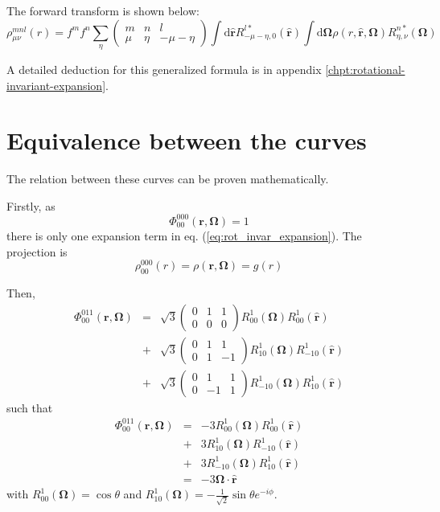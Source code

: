 The forward transform is shown below:
\begin{equation}
\rho_{\mu\nu}^{mnl}(r)=f^{m}f^{n}\sum_{\eta}\left(\begin{array}{ccc}
m & n & l\\
\mu & \eta & -\mu-\eta
\end{array}\right)\int\mathrm{d}\hat{\mathbf{r}}R_{-\mu-\eta,0}^{l*}(\mathbf{\hat{r}})\int\mathrm{d}\mathbf{\Omega}\rho(r,\hat{\mathbf{r}},\mathbf{\Omega})R_{\eta,\nu}^{n*}(\mathbf{\Omega})
\end{equation}

A detailed deduction for this generalized formula is in appendix \ref{chpt:rotational-invariant-expansion}.

\section{Equivalence between the curves}

The relation between these curves can be proven mathematically.

Firstly, as
\begin{equation}
\Phi_{00}^{000}(\mathbf{r},\mathbf{\Omega})=1
\end{equation}
there is only one expansion term in eq. (\ref{eq:rot_invar_expansion}).
The projection is
\begin{equation}
\rho_{00}^{000}(r)=\rho(\mathbf{r},\mathbf{\Omega})=g(r)
\end{equation}

Then,
\begin{eqnarray}
\Phi_{00}^{011}(\mathbf{r},\mathbf{\Omega}) & = & \sqrt{3}\left(\begin{array}{ccc}
0 & 1 & 1\\
0 & 0 & 0
\end{array}\right)R_{00}^{1}(\mathbf{\Omega})R_{00}^{1}(\mathbf{\hat{r}})\nonumber \\
 & + & \sqrt{3}\left(\begin{array}{ccc}
0 & 1 & 1\\
0 & 1 & -1
\end{array}\right)R_{10}^{1}(\mathbf{\Omega})R_{-10}^{1}(\mathbf{\hat{r}})\nonumber \\
 & + & \sqrt{3}\left(\begin{array}{ccc}
0 & 1 & 1\\
0 & -1 & 1
\end{array}\right)R_{-10}^{1}(\mathbf{\Omega})R_{10}^{1}(\mathbf{\hat{r}})
\end{eqnarray}
such that
\begin{eqnarray}
\Phi_{00}^{011}(\mathbf{r},\mathbf{\Omega}) & = & -3R_{00}^{1}(\mathbf{\Omega})R_{00}^{1}(\mathbf{\hat{r}})\nonumber \\
 & + & 3R_{10}^{1}(\mathbf{\Omega})R_{-10}^{1}(\mathbf{\hat{r}})\nonumber \\
 & + & 3R_{-10}^{1}(\mathbf{\Omega})R_{10}^{1}(\mathbf{\hat{r}})\\
 & = & -3\mathbf{\Omega}\cdot\hat{\mathbf{r}}
\end{eqnarray}
with $R_{00}^{1}(\mathbf{\Omega})=\cos\theta$ and $R_{10}^{1}(\mathbf{\Omega})=-\frac{1}{\sqrt{2}}\sin\theta e^{-i\phi}$.

